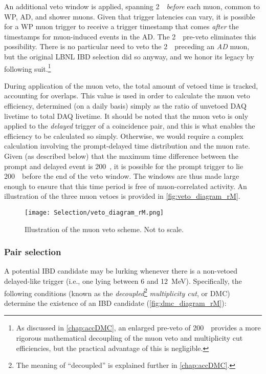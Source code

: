 \documentclass[../thesis.tex]{subfiles}
\begin{document}
An additional veto window is applied, spanning 2~\us\ \emph{before} each muon, common to WP, AD, and shower muons. Given that trigger latencies can vary, it is possible for a WP muon trigger to receive a trigger timestamp that comes \emph{after} the timestamps for muon-induced events in the AD. The 2~\us\ pre-veto eliminates this possibility. There is no particular need to veto the 2~\us\ preceding an \emph{AD} muon, but the original LBNL IBD selection did so anyway, and we honor its legacy by following suit.\footnote{As discussed in \ref{chap:accDMC}, an enlarged pre-veto of 200~\us\ provides a more rigorous mathematical decoupling of the muon veto and multiplicity cut efficiencies, but the practical advantage of this is negligible.}

During application of the muon veto, the total amount of vetoed time is tracked, accounting for overlaps. This value is used in order to calculate the muon veto efficiency, determined (on a daily basis) simply as the ratio of unvetoed DAQ livetime to total DAQ livetime. It should be noted that the muon veto is only applied to the \emph{delayed} trigger of a coincidence pair, and this is what enables the efficiency to be calculated so simply. Otherwise, we would require a complex calculation involving the prompt-delayed time distribution and the muon rate. Given (as described below) that the maximum time difference between the prompt and delayed event is 200~\us, it is possible for the prompt trigger to lie 200~\us\ before the end of the veto window. The windows are thus made large enough to ensure that this time period is free of muon-correlated activity. An illustration of the three muon vetoes is provided in \autoref{fig:veto_diagram_rM}.

\begin{figure}[h]
  \texttt{[image: Selection/veto\_diagram\_rM.png]}
  \caption{Illustration of the muon veto scheme. Not to scale.}
  \label{fig:veto_diagram_rM}
\end{figure}

\subsubsection{Pair selection}
\label{sec:pairSel}

A potential IBD candidate may be lurking whenever there is a non-vetoed delayed-like trigger (i.e., one lying between 6 and 12~MeV). Specifically, the following conditions (known as the \emph{decoupled}\footnote{The meaning of ``decoupled'' is explained further in \autoref{chap:accDMC}.} \emph{multiplicity cut}, or DMC) determine the existence of an IBD candidate (\autoref{fig:dmc_diagram_rM}):
\end{document}
